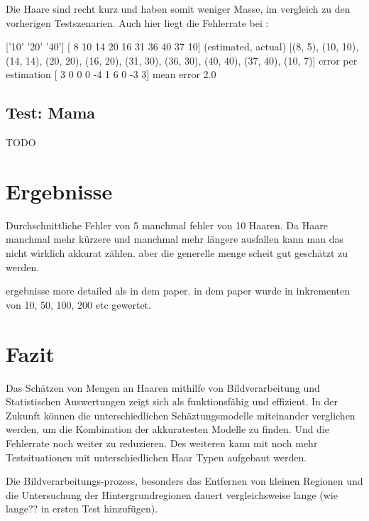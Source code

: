 \documentclass[german,a4paper, 12pt]{llncs}
\begin{document}
Die Haare sind recht kurz und haben somit weniger Masse, im vergleich zu den vorherigen Testszenarien. Auch hier liegt die Fehlerrate bei :  

['10' '20' '40']
[ 8 10 14 20 16 31 36 40 37 10]
(estimated, actual)
[(8, 5), (10, 10), (14, 14), (20, 20), (16, 20), (31, 30), (36, 30), (40, 40), (37, 40), (10, 7)]
error per estimation [ 3  0  0  0 -4  1  6  0 -3  3]
mean error 2.0

\subsection{Test: Mama}
TODO

\section{Ergebnisse}
Durchschnittliche Fehler von 5 manchmal fehler von 10 Haaren. 
Da Haare manchmal mehr kürzere und manchmal mehr längere ausfallen kann man das nicht wirklich akkurat zählen. aber die generelle menge scheit gut geschätzt zu werden. 

ergebnisse more detailed als in dem paper. in dem paper wurde in inkrementen von 10, 50, 100, 200 etc gewertet. 

\section{Fazit}
Das Schätzen von Mengen an Haaren mithilfe von Bildverarbeitung und Statistischen Auswertungen zeigt sich als funktionsfähig und effizient. In der Zukunft können die unterschiedlichen Schäztungsmodelle miteinander verglichen werden, um die Kombination der akkuratesten Modelle zu finden. Und die Fehlerrate noch weiter zu reduzieren.
Des weiteren kann mit noch mehr Testsituationen mit unterschiedlichen Haar Typen aufgebaut werden. 

Die Bildverarbeitungs-prozess, besonders das Entfernen von kleinen Regionen und die Untersuchung der Hintergrundregionen dauert vergleichsweise lange (wie lange?? in ersten Test hinzufügen).  

\end{document}
